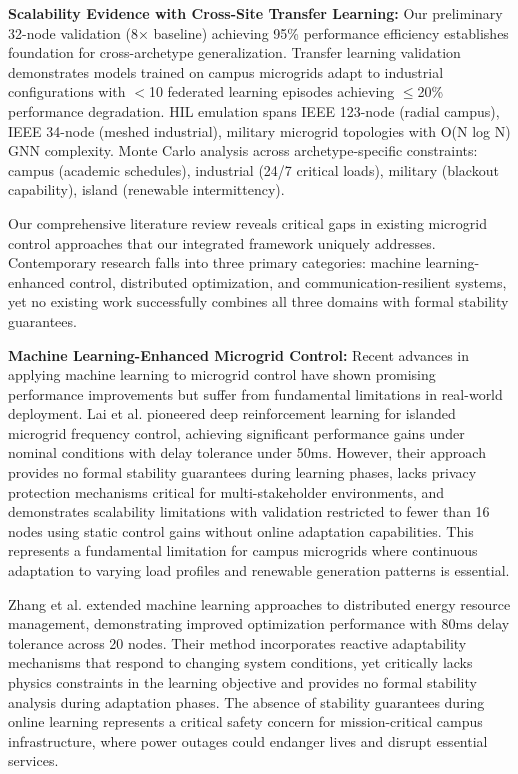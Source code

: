 \documentclass[12pt]{article}
\begin{document}
\textbf{Scalability Evidence with Cross-Site Transfer Learning:} Our preliminary 32-node validation (8× baseline) achieving 95\% performance efficiency establishes foundation for cross-archetype generalization. Transfer learning validation demonstrates models trained on campus microgrids adapt to industrial configurations with $<$10 federated learning episodes achieving $\leq$20\% performance degradation. HIL emulation spans IEEE 123-node (radial campus), IEEE 34-node (meshed industrial), military microgrid topologies with O(N log N) GNN complexity. Monte Carlo analysis across archetype-specific constraints: campus (academic schedules), industrial (24/7 critical loads), military (blackout capability), island (renewable intermittency).

Our comprehensive literature review reveals critical gaps in existing microgrid control approaches that our integrated framework uniquely addresses. Contemporary research falls into three primary categories: machine learning-enhanced control, distributed optimization, and communication-resilient systems, yet no existing work successfully combines all three domains with formal stability guarantees.

\textbf{Machine Learning-Enhanced Microgrid Control:} Recent advances in applying machine learning to microgrid control have shown promising performance improvements but suffer from fundamental limitations in real-world deployment. Lai et al. \cite{lai2023} pioneered deep reinforcement learning for islanded microgrid frequency control, achieving significant performance gains under nominal conditions with delay tolerance under 50ms. However, their approach provides no formal stability guarantees during learning phases, lacks privacy protection mechanisms critical for multi-stakeholder environments, and demonstrates scalability limitations with validation restricted to fewer than 16 nodes using static control gains without online adaptation capabilities. This represents a fundamental limitation for campus microgrids where continuous adaptation to varying load profiles and renewable generation patterns is essential.

Zhang et al. \cite{zhang2024} extended machine learning approaches to distributed energy resource management, demonstrating improved optimization performance with 80ms delay tolerance across 20 nodes. Their method incorporates reactive adaptability mechanisms that respond to changing system conditions, yet critically lacks physics constraints in the learning objective and provides no formal stability analysis during adaptation phases. The absence of stability guarantees during online learning represents a critical safety concern for mission-critical campus infrastructure, where power outages could endanger lives and disrupt essential services.
\end{document}
